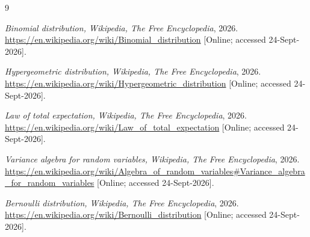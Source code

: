 \documentclass[a4paper,10pt]{article}
\begin{document}
\begin{thebibliography}{9}

  \emph{Binomial distribution, Wikipedia, The Free Encyclopedia}, 2026.
  \url{https://en.wikipedia.org/wiki/Binomial_distribution}
      [Online; accessed 24-Sept-2026].

  \emph{Hypergeometric distribution, Wikipedia, The Free Encyclopedia}, 2026.
  \url{https://en.wikipedia.org/wiki/Hypergeometric_distribution}
      [Online; accessed 24-Sept-2026].

  \emph{Law of total expectation, Wikipedia, The Free Encyclopedia}, 2026.
  \url{https://en.wikipedia.org/wiki/Law_of_total_expectation}
      [Online; accessed 24-Sept-2026].

  \emph{Variance algebra for random variables, Wikipedia, The Free Encyclopedia}, 2026.
  \url{https://en.wikipedia.org/wiki/Algebra_of_random_variables#Variance_algebra_for_random_variables}
      [Online; accessed 24-Sept-2026].

  \emph{Bernoulli distribution, Wikipedia, The Free Encyclopedia}, 2026.
  \url{https://en.wikipedia.org/wiki/Bernoulli_distribution}
      [Online; accessed 24-Sept-2026].

\end{thebibliography}
\end{document}
